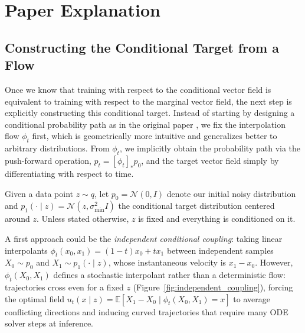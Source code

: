 \section{Paper Explanation}
\label{sec:paper}

\subsection{Constructing the Conditional Target from a Flow}

Once we know that training with respect to the conditional vector field is equivalent to training with respect to the marginal vector field, the next step is explicitly constructing this conditional target. Instead of starting by designing a conditional probability path as in the original paper \cite{lipman2023flow}, we fix the interpolation flow $\phi_t$ first, which is geometrically more intuitive and generalizes better to arbitrary distributions. From $\phi_t$, we implicitly obtain the probability path via the push-forward operation, $p_t = [\phi_t]_* p_0$, and the target vector field simply by differentiating with respect to time.

Given a data point $z \sim q$, let $p_0 = \mathcal{N}(0, I)$ denote our initial noisy distribution and $p_1(\cdot \mid z) = \mathcal{N}(z, \sigma_{\min}^2 I)$ the conditional target distribution centered around $z$. Unless stated otherwise, $z$ is fixed and everything is conditioned on it.

A first approach could be the \emph{independent conditional coupling}: taking linear interpolants $\phi_t(x_0, x_1) = (1 - t) x_0 + t x_1$ between independent samples $X_0 \sim p_0$ and $X_1 \sim p_1(\cdot \mid z)$, whose instantaneous velocity is $x_1 - x_0$. However, $\phi_t(X_0, X_1)$ defines a stochastic interpolant rather than a deterministic flow: trajectories cross even for a fixed $z$ (Figure~\ref{fig:independent_coupling}), forcing the optimal field $u_t(x \mid z) = \mathbb{E}[X_1 - X_0 \mid \phi_t(X_0, X_1) = x]$ to average conflicting directions and inducing curved trajectories that require many ODE solver steps at inference.

